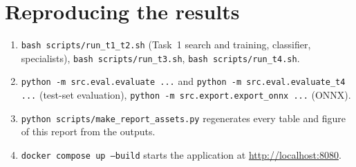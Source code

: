 \documentclass[conference]{IEEEtran}
\begin{document}
\section{Reproducing the results}
\begin{enumerate}\footnotesize
\item \texttt{bash scripts/run\_t1\_t2.sh} (Task~1 search and training, classifier, specialists), \texttt{bash scripts/run\_t3.sh}, \texttt{bash scripts/run\_t4.sh}.
\item \texttt{python -m src.eval.evaluate ...} and \texttt{python -m src.eval.evaluate\_t4 ...} (test-set evaluation), \texttt{python -m src.export.export\_onnx ...} (ONNX).
\item \texttt{python scripts/make\_report\_assets.py} regenerates every table and figure of this report from the outputs.
\item \texttt{docker compose up --build} starts the application at \url{http://localhost:8080}.
\end{enumerate}



\end{document}
